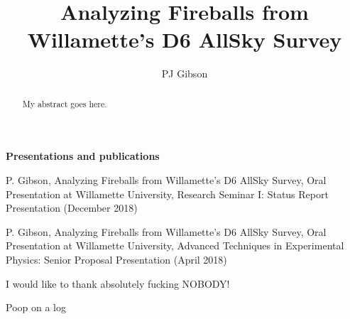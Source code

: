 \documentclass[12pt]{report}
\begin{document}
\title{Analyzing Fireballs from Willamette's D6 AllSky Survey}
\author{PJ Gibson}

\maketitle


\newpage

\begin{center}
\textbf{Presentations and publications}

P. Gibson, Analyzing Fireballs from Willamette's D6 AllSky Survey, Oral Presentation at Willamette University, Research Seminar I: Status Report Presentation (December 2018)
\bigskip

P. Gibson, Analyzing Fireballs from Willamette's D6 AllSky Survey, Oral Presentation at Willamette University, Advanced Techniques in Experimental Physics: Senior Proposal Presentation (April 2018)
\bigskip
\end{center}





\begin{acknowledgments}
I would like to thank absolutely fucking NOBODY!
\end{acknowledgments}

\begin{abstract}
My abstract goes here.
\end{abstract}

\tableofcontents
\listoftables
\listoffigures


\begin{Chapter}
Poop on a log



\end{Chapter}

%

%



\appendix
%
\end{document}
